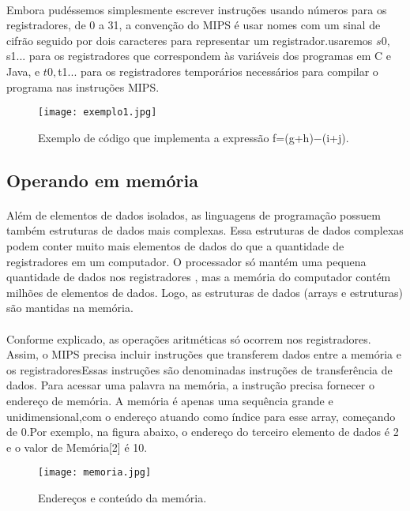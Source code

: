 \documentclass[12pt]{article}
\begin{document}
    \paragraph{}
    Embora pudéssemos simplesmente escrever instruções usando números para os registradores, de 0 a 31, a convenção do MIPS é usar nomes com um sinal de cifrão seguido por dois caracteres para representar um registrador.usaremos $s0, $s1... para os registradores que correspondem às variáveis dos programas em C e Java, e $t0, $t1... para os registradores temporários necessários para compilar o programa nas instruções MIPS.
    
\begin{figure}[h!]
    \texttt{[image: exemplo1.jpg]}
    \caption{Exemplo de código que implementa a expressão f=(g+h)−(i+j).}
    \label{fig:codigo_soma}
\end{figure}

\subsection{Operando em memória}
    \paragraph{}
    Além de elementos de dados isolados, as linguagens de programação possuem também estruturas de dados mais complexas. Essa estruturas de dados complexas podem conter muito mais elementos de dados do que a quantidade de registradores em um computador. O processador só mantém uma pequena quantidade de dados nos registradores , mas a memória do computador contém milhões de elementos  de dados. Logo, as estruturas de dados (arrays e estruturas) são mantidas na memória.
    \paragraph{}
    Conforme explicado, as operações aritméticas só ocorrem nos registradores. Assim, o MIPS precisa incluir instruções que transferem dados entre a memória e os registradoresEssas instruções são denominadas instruções de transferência de dados. Para acessar uma palavra na memória, a instrução precisa fornecer o endereço de memória. A memória é apenas uma sequência grande e unidimensional,com o endereço atuando como índice para esse array, começando de 0.Por exemplo, na figura abaixo, o endereço do terceiro elemento de dados é 2 e o valor de Memória[2] é 10.

\begin{figure}[h!]
    \texttt{[image: memoria.jpg]}
    \caption{Endereços e conteúdo da memória.}
    \label{fig:memoria}
\end{figure}
\end{document}
